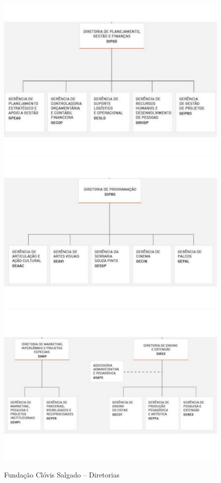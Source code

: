 \documentclass[a4paper, 12pt, openright, oneside, german, french, english, brazil]{abntex2}
\begin{document}
	\begin{figure}
		\centering
		\caption{Fundação Clóvis Salgado -- Diretorias}
		\includegraphics[scale=0.35]{dirplanejamento.pdf}
		\includegraphics[scale=0.35]{dirprogramacao.pdf}
		\includegraphics[scale=0.35]{dirmarketingensino.pdf}

\end{figure}
\end{document}
